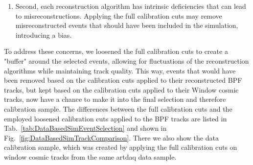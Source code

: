 \begin{enumerate}
\begin{enumerate}
\item Second, each reconstruction algorithm has intrinsic deficiencies that can lead to misreconstructions. Applying the full calibration cuts may remove misreconstructed events that should have been included in the simulation, introducing a bias.
\end{enumerate}

To address these concerns, we loosened the full calibration cuts to create a "buffer" around the selected events, allowing for fluctuations of the reconstruction algorithms while maintaining track quality. This way, events that would have been removed based on the calibration cuts applied to their reconstructed \gls{BPF} tracks, but kept based on the calibration cuts applied to their Window cosmic tracks, now have a chance to make it into the final selection and therefore calibration sample. The differences between the full calibration cuts and the employed loosened calibration cuts applied to the \gls{BPF} tracks are listed in Tab.~\ref{tab:DataBasedSimEventSelection} and shown in Fig.~\ref{fig:DataBasedSimTrackComparison}. There we also show the data calibration sample, which was created by applying the full calibration cuts on window cosmic tracks from the same artdaq data sample.
\end{enumerate}

